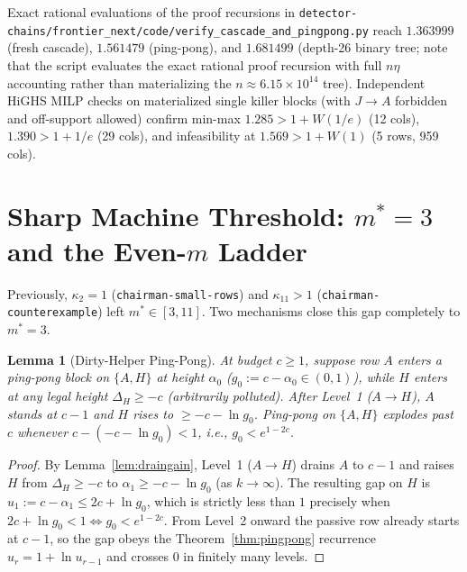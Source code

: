 \documentclass[11pt]{article}
\newtheorem{lemma}[theorem]{Lemma}
\theoremstyle{definition}
\newcommand{\disc}{\Delta}
\newcommand{\W}{W}
\begin{document}
Exact rational evaluations of the proof recursions in \texttt{detector-chains/frontier\_next/code/verify\_cascade\_and\_pingpong.py} reach $1.363999$ (fresh cascade), $1.561479$ (ping-pong), and $1.681499$ (depth-26 binary tree; note that the script evaluates the exact rational proof recursion with full $n\eta$ accounting rather than materializing the $n\approx 6.15\times 10^{14}$ tree). Independent HiGHS MILP checks on materialized single killer blocks (with $J\to A$ forbidden and off-support allowed) confirm min-max $1.285>1+\W(1/e)$ (12 cols), $1.390>1+1/e$ (29 cols), and infeasibility at $1.569>1+\W(1)$ (5 rows, 959 cols).

\section{Sharp Machine Threshold: $m^*=3$ and the Even-$m$ Ladder}

Previously, $\kappa_2=1$ (\texttt{chairman-small-rows}) and $\kappa_{11}>1$ (\texttt{chairman-counterexample}) left $m^*\in[3,11]$. Two mechanisms close this gap completely to $m^*=3$.

\begin{lemma}[Dirty-Helper Ping-Pong]\label{lem:dirty}
At budget $c\ge 1$, suppose row $A$ enters a ping-pong block on $\{A,H\}$ at height $\alpha_0$ ($g_0:=c-\alpha_0\in(0,1)$), while $H$ enters at \emph{any} legal height $\disc_H\ge -c$ (arbitrarily polluted). After Level~1 ($A\to H$), $A$ stands at $c-1$ and $H$ rises to $\ge -c-\ln g_0$. Ping-pong on $\{A,H\}$ explodes past $c$ whenever $c-(-c-\ln g_0)<1$, i.e., $g_0<e^{1-2c}$.
\end{lemma}
\begin{proof}
By Lemma~\ref{lem:draingain}, Level~1 ($A\to H$) drains $A$ to $c-1$ and raises $H$ from $\disc_H\ge -c$ to $\alpha_1\ge -c-\ln g_0$ (as $k\to\infty$). The resulting gap on $H$ is $u_1:=c-\alpha_1\le 2c+\ln g_0$, which is strictly less than $1$ precisely when $2c+\ln g_0<1\iff g_0<e^{1-2c}$. From Level~2 onward the passive row already starts at $c-1$, so the gap obeys the Theorem~\ref{thm:pingpong} recurrence $u_r=1+\ln u_{r-1}$ and crosses $0$ in finitely many levels.
\end{proof}
\end{document}
